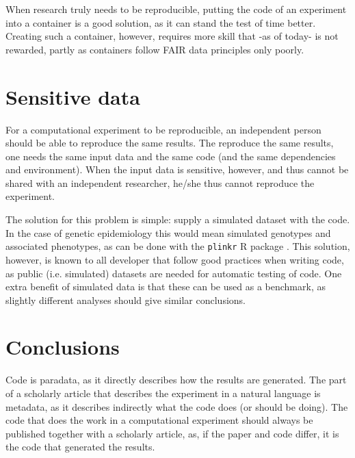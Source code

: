 
When research truly needs to be reproducible, putting the code 
of an experiment into a container is a good solution, as it 
can stand the test of time better.
Creating such a container, however, requires more skill
that -as of today- is not rewarded,
partly as containers follow FAIR data principles only poorly.

\section{Sensitive data}

For a computational experiment to be reproducible,
an independent person should be able to
reproduce the same results.
The reproduce the same results, one needs the same
input data and the same code (and the same 
dependencies and environment).
When the input data is sensitive, however, and thus cannot be shared with
an independent researcher, he/she thus cannot reproduce the
experiment.

The solution for this problem is simple:
supply a simulated dataset with the code.
In the case of genetic epidemiology this would mean
simulated genotypes and associated phenotypes,
as can be done with the \verb|plinkr| R package \cite{plinkr}.
This solution, however, is known to all developer that follow
good practices when writing code, as public (i.e. simulated) 
datasets are needed for automatic testing of code.
One extra benefit of simulated data is that these can be used
as a benchmark, as slightly different analyses should give 
similar conclusions.

\section{Conclusions}

Code is paradata, as it directly describes how the results are generated.
The part of a scholarly article 
that describes the experiment in a natural language is metadata, 
as it describes indirectly what the code does (or should be doing).
The code that does the work in a computational experiment should
always be published together with a scholarly article,
as, if the paper and code differ, it is the code that generated the results.

